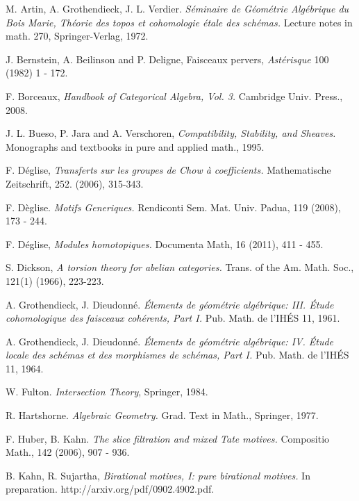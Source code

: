 \newpage

\begin{thebibliography}{10}

M. Artin, A. Grothendieck, J. L. Verdier.
{\em S\'eminaire de G\'eom\'etrie Alg\'ebrique du Bois Marie,
Th\'eorie des topos et cohomologie \'etale des sch\'emas.}
Lecture notes in math. 270, Springer-Verlag, 1972.

J. Bernstein, A. Beilinson and P. Deligne,
Faisceaux pervers, {\em Ast\'erisque} 100 (1982) 1 - 172.

F. Borceaux,
{\em Handbook of Categorical Algebra, Vol. 3.}
Cambridge Univ. Press., 2008.

J. L. Bueso, P. Jara and A. Verschoren,
{\em Compatibility, Stability, and Sheaves.}
Monographs and textbooks in pure and applied math.,
1995.

F. D\'eglise,
\emph{Transferts sur les groupes de Chow \`a coefficients.}
Mathematische Zeitschrift, 252. (2006), 315-343.

F. D\`eglise.
\emph{Motifs Generiques.}
Rendiconti Sem. Mat. Univ. Padua, 119 (2008), 173 - 244.

F. D\'eglise, 
\emph{Modules homotopiques.}
Documenta Math,
16 (2011), 411 - 455.

S. Dickson,
\emph{A torsion theory for abelian categories.}
Trans. of the Am. Math. Soc., 121(1) (1966), 223-223.

A. Grothendieck, J. Dieudonn\'e.
{\em \'Elements de g\'eom\'etrie alg\'ebrique: III. \'Etude 
cohomologique des faisceaux coh\'erents, Part I.} 
Pub. Math. de l'IH\'ES 11, 1961.

A. Grothendieck, J. Dieudonn\'e.
\emph{\'Elements de g\'eom\'etrie alg\'ebrique: IV. \'Etude locale 
des sch\'emas et des morphismes de sch\'emas, Part I.}
Pub. Math. de l'IH\'ES 11, 1964.

W. Fulton.
\emph{Intersection Theory},
Springer, 1984.

R. Hartshorne.
\emph{Algebraic Geometry.}
Grad. Text in Math.,
Springer, 1977.

F. Huber, B. Kahn.
\emph{The slice filtration and mixed Tate motives.}
Compositio Math., 142 (2006), 907 - 936.

B. Kahn, R. Sujartha,
\emph{Birational motives, I: pure birational motives.}
In preparation.
http://arxiv.org/pdf/0902.4902.pdf.


\end{thebibliography}
